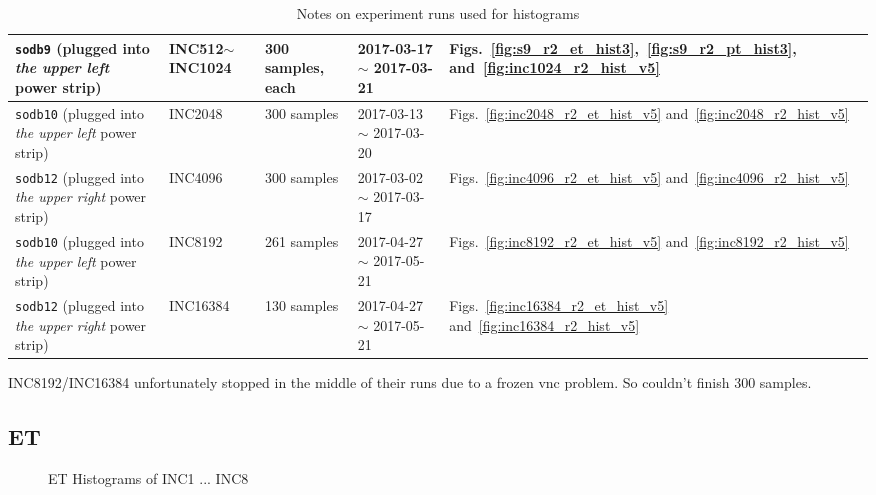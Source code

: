 \begin{table}[h]
\begin{center}
\begin{tabular}{|p{2cm}|p{3cm}|p{3cm}|p{4cm}|p{4cm}|}
{\tt sodb9} (plugged into {\em the upper left} power strip) &  INC512$\sim$INC1024 & 300 samples, each & 2017-03-17 $\sim$ 2017-03-21 & 
Figs.~\ref{fig:s9_r2_et_hist3},~\ref{fig:s9_r2_pt_hist3}, and~\ref{fig:inc1024_r2_hist_v5}\\ \hline
{\tt sodb10} (plugged into {\em the upper left} power strip) & INC2048 & 300 samples & 2017-03-13 $\sim$ 2017-03-20 & Figs.~\ref{fig:inc2048_r2_et_hist_v5} and~\ref{fig:inc2048_r2_hist_v5}\\ \hline
{\tt sodb12} (plugged into {\em the upper right} power strip) & INC4096 & 300 samples & 2017-03-02 $\sim$ 2017-03-17 & Figs.~\ref{fig:inc4096_r2_et_hist_v5} and~\ref{fig:inc4096_r2_hist_v5}\\ \hline
{\tt sodb10} (plugged into {\em the upper left} power strip) & INC8192& 261 samples & 2017-04-27 $\sim$ 2017-05-21 & Figs.~\ref{fig:inc8192_r2_et_hist_v5} and~\ref{fig:inc8192_r2_hist_v5}\\ \hline
{\tt sodb12} (plugged into {\em the upper right} power strip) & INC16384& 130 samples & 2017-04-27 $\sim$ 2017-05-21 & Figs.~\ref{fig:inc16384_r2_et_hist_v5} and~\ref{fig:inc16384_r2_hist_v5}\\ \hline
\end{tabular}
\end{center}
\vspace{-.2in}
\caption{Notes on experiment runs used for histograms\label{tab:exp_notes2}}
\end{table}

INC8192/INC16384 unfortunately stopped in the middle of their runs due to a frozen vnc problem. So couldn't finish 300 samples.

\pagebreak

\subsection{ET}

\begin{figure}[hp!]
	\centering
	\caption{ET Histograms of INC1 ... INC8~\label{fig:s9_r2_et_hist1}}
\end{figure}

